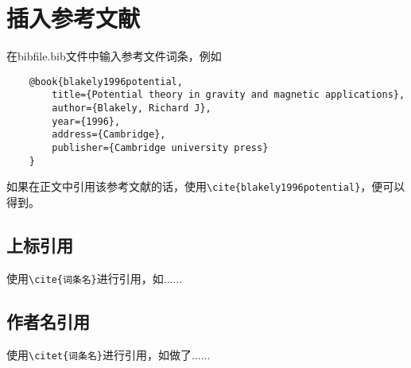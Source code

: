 \chapter{插入参考文献}
在bibfile.bib文件中输入参考文件词条，例如
\begin{verbatim}
	@book{blakely1996potential,
		title={Potential theory in gravity and magnetic applications},
		author={Blakely, Richard J},
		year={1996},
		address={Cambridge},
		publisher={Cambridge university press}
	}
\end{verbatim}

如果在正文中引用该参考文献的话，使用\verb|\cite{blakely1996potential}|，便可以得到\cite{blakely1996potential}。
\section{上标引用}
使用\verb|\cite{词条名}|进行引用，如\cite{hofmann2006physical}......

\section{作者名引用}
使用\verb|\citet{词条名}|进行引用，如\citet{blakely1996potential}做了......

